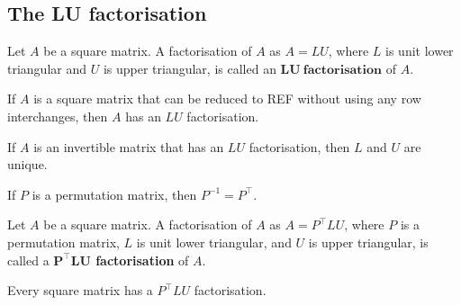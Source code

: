 \documentclass{article}
\begin{document}
\subsection{The LU factorisation}
\begin{definition}
	Let $A$ be a square matrix. A factorisation of $A$ as $A=LU$, where $L$ is unit lower triangular and $U$ is upper triangular, is called an $\mathbf{LU\: factorisation}$ of $A$.
\end{definition}
\begin{theorem}
	If $A$ is a square matrix that can be reduced to REF without using any row interchanges, then $A$ has an $LU$ factorisation.
\end{theorem}
\begin{theorem}
	If $A$ is an invertible matrix that has an $LU$ factorisation, then $L$ and $U$ are unique.
\end{theorem}
\begin{theorem}
	If $P$ is a permutation matrix, then $P^{-1}=P^\intercal$.
\end{theorem}
\begin{definition}
	Let $A$ be a square matrix. A factorisation of $A$ as $A=P^\intercal LU$, where $P$ is a permutation matrix, $L$ is unit lower triangular, and $U$ is upper triangular, is called a \textbf{$\mathbf{P^\intercal LU}$ factorisation} of $A$.
\end{definition}
\begin{theorem}
	Every square matrix has a $P^\intercal LU$ factorisation.
\end{theorem}
\end{document}
